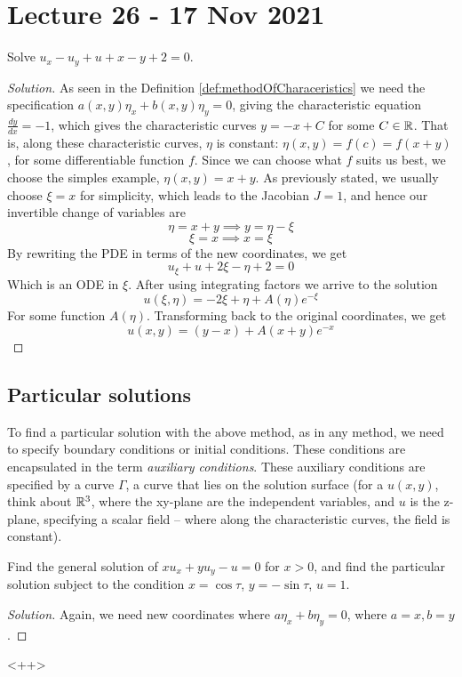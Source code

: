 \section{Lecture 26 - 17 Nov 2021}
\begin{example}
  Solve $u_x-u_y+u+x-y+2=0$.
\end{example}
\begin{proof}[Solution]
  As seen in the Definition \ref{def:methodOfCharaceristics} we need the specification
  $a(x,y)\eta_x+b(x,y)\eta_y=0$, giving the characteristic equation $\frac{dy}{dx}=-1$,
  which gives the characteristic curves $y=-x+C$ for some $C\in \mathbb R$. That is, along these
  characteristic curves, $\eta$ is constant: $\eta(x,y)=f(c)=f(x+y)$, for some
  differentiable function $f$. Since we can choose what $f$ suits us best, we choose the
  simples example, $\eta(x,y)=x+y$. As previously stated, we usually choose $\xi=x$ for
  simplicity, which leads to the Jacobian $J=1$, and hence our invertible change of
  variables are
  \[\eta=x+y \implies y=\eta-\xi\]
  \[\xi=x \implies x=\xi\]
  By rewriting the PDE in terms of the new coordinates, we get
  \[u_{\xi}+u+2\xi-\eta+2 =0\]
  Which is an ODE in $\xi$. After using integrating factors we arrive to the solution
  \[u(\xi,\eta)=-2\xi+\eta+A(\eta)e^{-
  \xi}\]
  For some function $A(\eta)$. Transforming back to the original coordinates, we get
  \[u(x,y)=(y-x)+A(x+y)e^{-x}\]
\end{proof}

\subsection{Particular solutions}
To find a particular solution with the above method, as in any method, we need to specify
boundary conditions or initial conditions. These conditions are encapsulated in the term
\emph{auxiliary conditions}. These auxiliary conditions are specified by a curve $\Gamma$,
a curve that lies on the solution surface (for a $u(x,y)$, think about $\mathbb R^3$, where the
  xy-plane are the independent variables, and $u$ is the z-plane, specifying a scalar
field -- where along the characteristic curves, the field is constant). 
\begin{example}
  Find the general solution of $xu_x+yu_y-u=0$ for $x>0$, and find the particular solution
  subject to the condition $x=\cos\tau$, $y=-\sin\tau$, $u=1$.
\end{example}
\begin{proof}[Solution]
  Again, we need new coordinates where $a\eta_x+b\eta_y=0$, where $a=x,b=y$.
\end{proof}<++>
